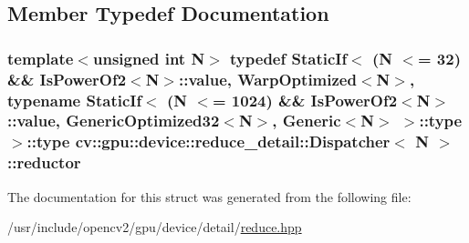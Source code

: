 \subsection{Member Typedef Documentation}
\hypertarget{structcv_1_1gpu_1_1device_1_1reduce__detail_1_1Dispatcher_ae22f9b091301817a504b822aab5a0d81}{
\subsubsection[{reductor}]{\setlength{\rightskip}{0pt plus 5cm}template$<$unsigned int N$>$ typedef {\bf Static\-If}$<$ (N $<$= 32) \&\& {\bf Is\-Power\-Of2}$<$N$>$\-::{\bf value}, {\bf Warp\-Optimized}$<$N$>$, typename {\bf Static\-If}$<$ (N $<$= 1024) \&\& {\bf Is\-Power\-Of2}$<$N$>$\-::{\bf value}, {\bf Generic\-Optimized32}$<$N$>$, {\bf Generic}$<$N$>$ $>$\-::{\bf type} $>$\-::{\bf type} {\bf cv\-::gpu\-::device\-::reduce\-\_\-detail\-::\-Dispatcher}$<$ N $>$\-::{\bf reductor}}}\label{structcv_1_1gpu_1_1device_1_1reduce__detail_1_1Dispatcher_ae22f9b091301817a504b822aab5a0d81}


The documentation for this struct was generated from the following file\-:\begin{DoxyCompactItemize}
\item 
/usr/include/opencv2/gpu/device/detail/\hyperlink{detail_2reduce_8hpp}{reduce.\-hpp}\end{DoxyCompactItemize}
